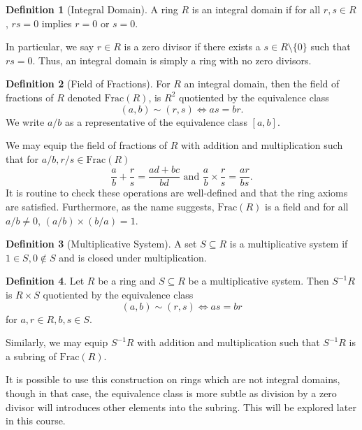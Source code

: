 \documentclass[]{article}
\theoremstyle{definition}
\theoremstyle{definition}
\newtheorem{definition}{Definition}[section]
\begin{document}
\begin{definition}[Integral Domain]
  A ring \(R\) is an integral domain if for all \(r, s \in R\), \(rs = 0\) 
  implies \(r = 0\) or \(s = 0\).
\end{definition}

In particular, we say \(r \in R\) is a zero divisor if there exists a 
\(s \in R \setminus \{0\}\) such that \(rs = 0\). Thus, an integral domain 
is simply a ring with no zero divisors. 

\begin{definition}[Field of Fractions]
  For \(R\) an integral domain, then the field of fractions of \(R\) denoted 
  \(\text{Frac}(R)\), is \(R^2\) quotiented by the equivalence class 
  \[(a, b) \sim (r, s) \iff as = br.\]
  We write \(a / b\) as a representative of the equivalence class \([a, b]\).
\end{definition}

We may equip the field of fractions of \(R\) with addition and multiplication 
such that for \(a / b, r / s \in \text{Frac}(R)\) 
\[\frac{a}{b} + \frac{r}{s} = \frac{ad + bc}{bd} \text{ and } 
  \frac{a}{b} \times \frac{r}{s} = \frac{ar}{bs}.\]
It is routine to check these operations are well-defined and that the ring 
axioms are satisfied. Furthermore, as the name suggests, \(\text{Frac}(R)\) 
is a field and for all \(a / b \neq 0\), \((a / b) \times (b / a) = 1\).

\begin{definition}[Multiplicative System]
  A set \(S \subseteq R\) is a multiplicative system if \(1 \in S, 0 \notin S\) 
  and is closed under multiplication.
\end{definition}

\begin{definition}
  Let \(R\) be a ring and \(S \subseteq R\) be a multiplicative system. Then 
  \(S^{-1}R\) is \(R \times S\) quotiented by the equivalence class 
  \[(a, b) \sim (r, s) \iff as = br\]
  for \(a, r \in R, b, s \in S\).
\end{definition}

Similarly, we may equip \(S^{-1}R\) with addition and multiplication such that 
\(S^{-1}R\) is a subring of \(\text{Frac}(R)\). 

It is possible to use this construction on rings which are not integral domains, 
though in that case, the equivalence class is more subtle as division by a 
zero divisor will introduces other elements into the subring. This will be explored 
later in this course.
\end{document}
